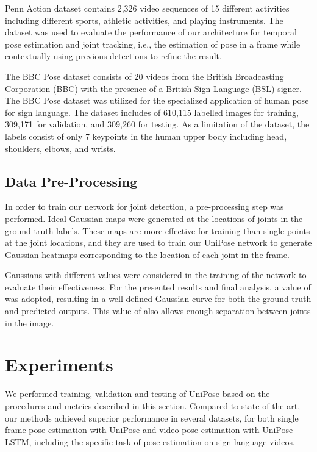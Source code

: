 \documentclass[10pt,twocolumn,letterpaper]{article}
\begin{document}
Penn Action \cite{PennAction} dataset contains 2,326 video sequences of 15 different activities including different sports, athletic activities, and playing instruments. The dataset was used to evaluate the performance of our architecture for temporal pose estimation and joint tracking, i.e., the estimation of pose in a frame while contextually using previous detections to refine the result.

The BBC Pose dataset \cite{BBC} consists of 20 videos from the British Broadcasting Corporation (BBC) with the presence of a British Sign Language (BSL) signer. The BBC Pose dataset was utilized for the specialized application of human pose for sign language. 
The dataset includes of 610,115 labelled images for training, 309,171 for validation, and 309,260 for testing. As a limitation of the dataset, the labels consist of only 7 keypoints in the human upper body including head, shoulders, elbows, and wrists.

\subsection{Data Pre-Processing}
In order to train our network for joint detection, a pre-processing step was performed. 
Ideal Gaussian maps were generated at the locations of joints in the ground truth labels.
These maps are more effective for training than single points at the joint locations, and they are used to train our UniPose network to generate Gaussian heatmaps corresponding to the location of each joint in the frame.

Gaussians with different  values were considered in the training of the network to evaluate their effectiveness. For the presented results and final analysis, a value of  was adopted, resulting in a well defined Gaussian curve for both the ground truth and predicted outputs. This value of  also allows enough separation between joints in the image.













\section{Experiments}
We performed training, validation and testing of UniPose based on the procedures and metrics described in this section.  
Compared to state of the art, our methods achieved superior performance in several datasets, for both single frame pose estimation with UniPose and video pose estimation with UniPose-LSTM, including the specific task of pose estimation on sign language videos.
\end{document}
